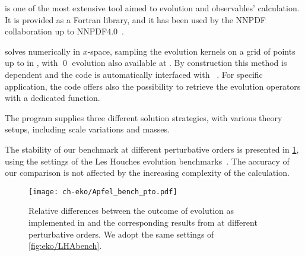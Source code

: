 \apfel{} \cite{Bertone:2013vaa} is one of the most extensive tool aimed to
\pdf{}  evolution and \dis{} observables' calculation. It is provided as a
Fortran library, and it has been used by the NNPDF collaboration up to
NNPDF4.0~\cite{NNPDF:2021njg}.

\apfel{} solves \dglap{} numerically in $x$-space, sampling the evolution
kernels on a grid of points up to \nnlo{} in \qcd{}, with \qed{} evolution also
available at \lo{}.
By construction this method is \pdf{} dependent and the code is automatically
interfaced with \lhapdf{}~\cite{Buckley:2014ana}. For specific application,
the code offers also the possibility to retrieve the evolution operators
with a dedicated function.

The program supplies three different solution strategies, with various theory
setups, including scale variations and \msbar{} masses.

The stability of our benchmark at different perturbative orders is presented in \cref{fig:eko/Apfelbench_pto},
using the settings of the Les Houches \pdf{} evolution benchmarks~\cite{Giele:2002hx,Dittmar:2005ed}.
The accuracy of our comparison is not affected by the increasing complexity
of the calculation.

\begin{figure}
    \texttt{[image: ch-eko/Apfel\_bench\_pto.pdf]}
    \caption{Relative differences between the outcome of evolution as
        implemented in \eko{} and the corresponding results from \apfel{} at
        different perturbative orders.  We adopt the same settings of
        \cref{fig:eko/LHAbench}.}
    \label{fig:eko/Apfelbench_pto}
\end{figure}
